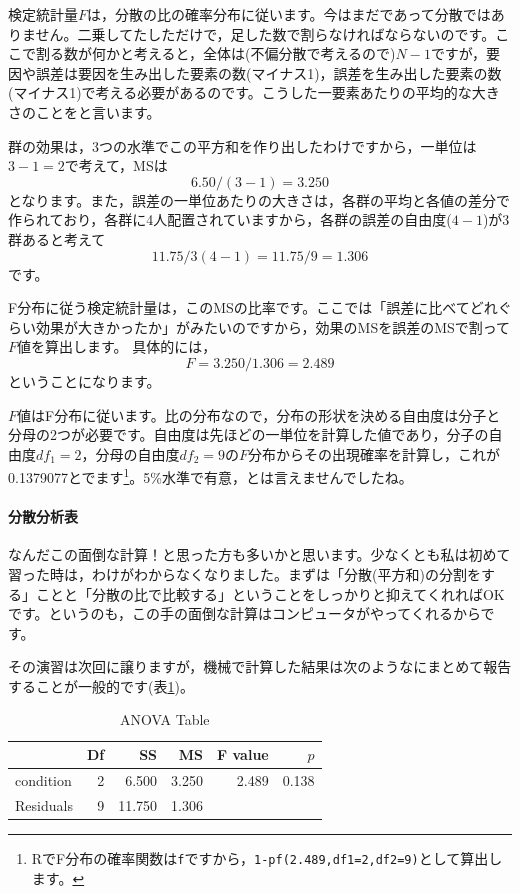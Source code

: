 \documentclass{ltjbook}
\begin{document}
検定統計量$F$は，分散の比の確率分布に従います。今はまだであって分散ではありません。二乗してたしただけで，足した数で割らなければならないのです。ここで割る数が何かと考えると，全体は(不偏分散で考えるので)$N-1$ですが，要因や誤差は要因を生み出した要素の数(マイナス1)，誤差を生み出した要素の数(マイナス1)で考える必要があるのです。こうした一要素あたりの平均的な大きさのことをと言います。

群の効果は，3つの水準でこの平方和を作り出したわけですから，一単位は$3-1=2$で考えて，MSは
\[ 6.50 / (3-1) = 3.250\]
となります。また，誤差の一単位あたりの大きさは，各群の平均と各値の差分で作られており，各群に4人配置されていますから，各群の誤差の自由度($4-1$)が3群あると考えて
\[ 11.75/3(4-1)=11.75/9 = 1.306\]
です。

F分布に従う検定統計量は，このMSの比率です。ここでは「誤差に比べてどれぐらい効果が大きかったか」がみたいのですから，効果のMSを誤差のMSで割って$F$値を算出します。
具体的には，
\[F = 3.250/1.306 = 2.489\]
ということになります。

$F$値はF分布に従います。比の分布なので，分布の形状を決める自由度は分子と分母の2つが必要です。自由度は先ほどの一単位を計算した値であり，分子の自由度$df_1 =2$，分母の自由度$df_2 = 9$の$F$分布からその出現確率を計算し，これが0.1379077とでます\footnote{RでF分布の確率関数は\texttt{f}ですから，\texttt{1-pf(2.489,df1=2,df2=9)}として算出します。}。5\%水準で有意，とは言えませんでしたね。
\paragraph{分散分析表}
なんだこの面倒な計算！と思った方も多いかと思います。少なくとも私は初めて習った時は，わけがわからなくなりました。まずは「分散(平方和)の分割をする」ことと「分散の比で比較する」ということをしっかりと抑えてくれればOKです。というのも，この手の面倒な計算はコンピュータがやってくれるからです。

その演習は次回に譲りますが，機械で計算した結果は次のようなにまとめて報告することが一般的です(表\ref{tbl::21_05})。
\begin{table}[ht]
	\centering
	\caption{ANOVA Table}
	\begin{tabular}{lrrrrr}
		\hline
		          & Df & SS     & MS    & F value & $p$   \\
		\hline
		condition & 2  & 6.500  & 3.250 & 2.489   & 0.138 \\
		Residuals & 9  & 11.750 & 1.306 &         &       \\
		\hline
	\end{tabular}
	\label{tbl::21_05}
\end{table}
\end{document}
